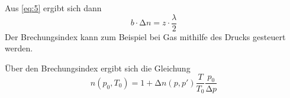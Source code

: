 Aus \ref{eq:5} ergibt sich dann 
\begin{equation}
\label{eq:6}
	b \cdot \increment n = z \cdot \frac{\lambda}{2}
\end{equation}
Der Brechungsindex kann zum Beispiel bei Gas mithilfe des Drucks gesteuert werden.

Über den Brechungsindex ergibt sich die Gleichung
\begin{equation}
\label{eq:7}
	n(p_0,T_0) = 1 + \increment n(p,p')\frac{T}{T_0}\frac{p_0}{\increment p}
\end{equation}








